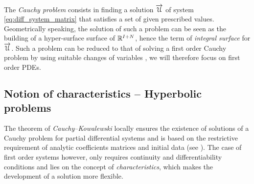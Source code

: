 The \textit{Cauchy problem} consists in finding a solution ${\overrightarrow{\mathcal{U}}}$ of system \eqref{eq:diff_system_matrix} that satisfies a set of given prescribed values. Geometrically speaking, the solution of such a problem can be seen as the building of a hyper-surface surface of $\mathbb{R}^{I+N}$, hence the term of \textit{integral surface} for ${\overrightarrow{\mathcal{U}}}$. Such a problem can be reduced to that of solving a first order Cauchy problem by using suitable changes of variables \cite[p.54]{PDEs}, we will therefore focus on first order PDEs.

\subsection{Notion of characteristics -- Hyperbolic problems}
The theorem of \textit{Cauchy--Kowalewski} locally ensures the existence of solutions of a Cauchy problem for partial differential systems and is based on the restrictive requirement of analytic coefficients matrices and initial data (see \cite[p.46]{PDEs}). The case of first order systems however, only requires continuity and differentiability conditions and lies on the concept of \textit{characteristics}, which makes the development of a solution more flexible.

